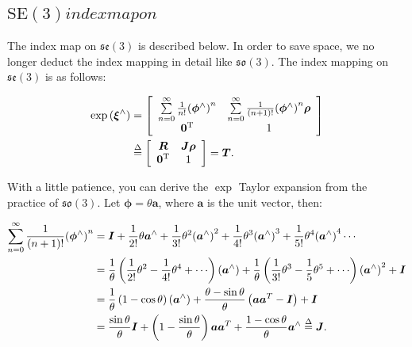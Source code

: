 \subsection{$\mathrm{SE}(3) index map on $}

The index map on $\mathfrak{se}(3)$ is described below. In order to save space, we no longer deduct the index mapping in detail like $\mathfrak{so}(3)$. The index mapping on $\mathfrak{se}(3)$ is as follows:

\begin{align}
\exp \left( {{ \boldsymbol{\xi} ^ \wedge }} \right) &= \left[ {\begin{array}{*{20}{c}}
	{\sum\limits_{n = 0}^\infty {\frac{1}{{n!}}{{\left( {{\boldsymbol{\phi} ^ \wedge }} \right)}^n} } }&{\sum\limits_{n = 0}^\infty {\frac{1}{{\left( {n + 1} \right)!}}{{\left( {{\boldsymbol{\phi } ^ \wedge }} \right)}^n} \boldsymbol{\rho} } }\\
	{{\bm{0}^\mathrm{T}}}&1
	\end{array}} \right] \\
&\buildrel \Delta \over = \left[ {\begin{array}{*{20}{c}}
	\bm{R} &{\bm{J\rho} } \\
	{{\bm{0}^\mathrm{T}}}&1
	\end{array}} \right] = \bm{T}.
\end{align}

With a little patience, you can derive the $\exp$ Taylor expansion from the practice of $\mathfrak{so}(3)$. Let $\boldsymbol{\phi}=\theta \bm{a}$, where $\bm{a}$ is the unit vector, then:

\begin{equation}
	\begin{aligned}
		\sum\limits_{n = 0}^\infty {\frac{1}{{\left( {n + 1} \right)!}}{{\left( {{\boldsymbol{\phi} ^ \wedge }} \right)}^n}} &= \bm{I} + \frac{1}{{2!}}\theta {\bm{a}^ \wedge } + \frac{1}{{3 !}}{\theta ^2}{\left( {{\bm{a}^ \wedge }} \right)^2} + \frac{1}{{4!}}{\theta ^3}{ \left( {{\bm{a}^ \wedge }} \right)^3} + \frac{1}{{5!}}{\theta ^4}{\left( {{\bm{a} ^ \wedge }} \right)^4} \cdots \\
		&= \frac{1}{\theta }\left( {\frac{1}{{2!}}{\theta ^2} - \frac{1}{{4!}}{\theta ^4} + \cdots } \right)\left( {{\bm{a}^ \wedge }} \right) + \frac{1}{\theta }\left( {\frac{1}{{3!}} {\theta ^3} - \frac{1}{5}{\theta ^5} + \cdots } \right){\left( {{\bm{a}^ \wedge }} \right)^2} + \bm{I}\\
		&= \frac{1}{\theta }\left( {1 - \cos \theta } \right)\left( {{\bm{a}^ \wedge }} \right) + \frac{{\theta - \sin \theta }}{\theta }\left( {\bm{a}{\bm{a}^T} - \bm{I}} \right) + \bm{I}\\
		&= \frac{{\sin \theta }}{\theta }\bm{I} + \left( {1 - \frac{{\sin \theta }}{\theta }} \right)\bm{a }{\bm{a}^T} + \frac{{1 - \cos \theta }}{\theta }{\bm{a}^ \wedge } \buildrel \Delta \over = \bm{J}.
	\end{aligned}
\end{equation}

